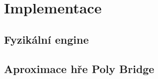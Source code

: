 \chapter{Implementace}

\section{Fyzikální engine}

\section{Aproximace hře Poly Bridge}

\section{}
